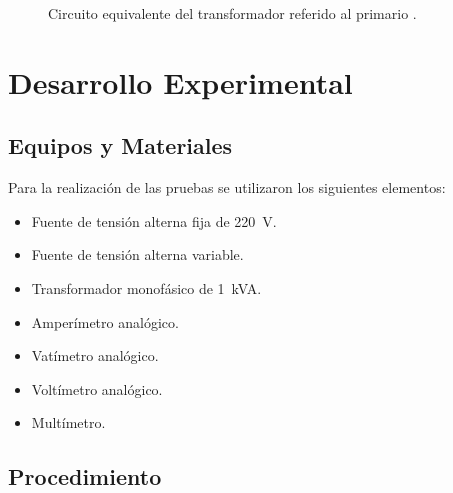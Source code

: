 \documentclass[conference]{IEEEtran}
\begin{document}
\begin{figure}[!t]
\centering
{}
\caption{Circuito equivalente del transformador referido al primario \cite{chapman}.}
\label{fig:eq_transformer}
\end{figure}


\section{Desarrollo Experimental}

\subsection{Equipos y Materiales}
Para la realización de las pruebas se utilizaron los siguientes elementos:
\begin{itemize}
    \item Fuente de tensión alterna fija de 220~V.
    \item Fuente de tensión alterna variable.
    \item Transformador monofásico de 1~kVA.
    \item Amperímetro analógico.
    \item Vatímetro analógico.
    \item Voltímetro analógico.
    \item Multímetro.
\end{itemize}

\subsection{Procedimiento}
\end{document}
